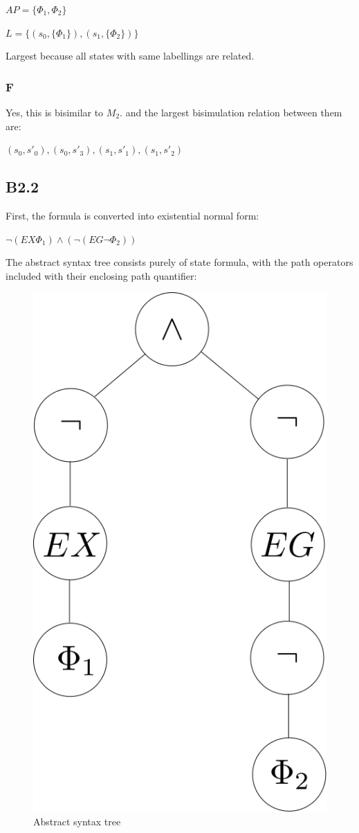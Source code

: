 $AP = \{\Phi_1, \Phi_2\}$

$L = \{(s_0, \{\Phi_1\}), (s_1, \{\Phi_2\})\}$

Largest because all states with same labellings are related.

\subsubsection{F}

Yes, this is bisimilar to $M_2$. and the largest bisimulation relation between them are:

$(s_0,s'_0),(s_0,s'_3),(s_1,s'_1),(s_1,s'_2)$

\subsection{B2.2}

First, the formula is converted into existential normal form:

$\neg (EX \Phi_1) \wedge (\neg (EG \neg \Phi_2))$

The abstract syntax tree consists purely of state formula,
with the path operators included with their enclosing path quantifier:

\begin{figure}[!htb]
\centering
\includegraphics[scale=.4]{abstract_syntax_tree.png}
\caption{Abstract syntax tree}
\label{fig:ast}
\end{figure}

